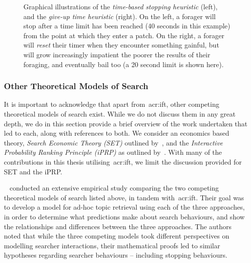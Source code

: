 \begin{figure}[t!]
    \centering
    \caption[Time-based stopping heuristics]{Graphical illustrations of the \emph{time-based stopping heuristic} (left), and the \emph{give-up time heuristic} (right). On the left, a forager will stop after a time limit has been reached (40 seconds in this example) from the point at which they enter a patch. On the right, a forager will \emph{reset} their timer when they encounter something gainful, but will grow increasingly impatient the poorer the results of their foraging, and eventually bail too (a 20 second limit is shown here).}
    \label{fig:gut}
\end{figure}


\subsubsection{Other Theoretical Models of Search}\label{sec:stopping_background:models:theoretical:other}
It is important to acknowledge that apart from~\gls{acr:ift}, other competing theoretical models of search exist. While we do not discuss them in any great depth, we do in this section provide a brief overview of the work undertaken that led to each, along with references to both. We consider an economics based theory, \emph{Search Economic Theory (SET)} outlined by~\cite{azzopardi2011economics}, and the \emph{Interactive Probability Ranking Principle (iPRP)} as outlined by~\cite{fuhr2008iprp}. With many of the contributions in this thesis utilising~\gls{acr:ift}, we limit the discussion provided for SET and the iPRP.

\noindent
{}~\cite{azzopardi2015theories} conducted an extensive empirical study comparing the two competing theoretical models of search listed above, in tandem with~\gls{acr:ift}. Their goal was to develop a model for ad-hoc topic retrieval using each of the three approaches, in order to determine what predictions make about search behaviours, and show the relationships and differences between the three approaches. The authors noted that while the three competing models took different perspectives on modelling searcher interactions, their mathematical proofs led to similar hypotheses regarding searcher behaviours -- including stopping behaviours.

